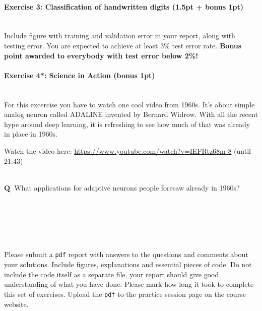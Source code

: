 \documentclass[a4paper,11pt]{article}
\newenvironment{exercise}[3]{\paragraph{Exercise #1: #2 (#3pt)}\ \\}{
\medskip}
\newcommand{\question}[2]{\setlength\parindent{0mm}\ \\$\mathbf{Q_#1:}$ #2\ \\}
\begin{document}
\begin{exercise}{3}{Classification of handwritten digits}{1.5pt + bonus 1}
Include figure with training and validation error in your report, along with testing error. You are expected to achieve at least 3\% test error rate. \textbf{Bonus point awarded to everybody with test error below 2\%!}

\end{exercise}



%
%
\begin{exercise}{4*}{Science in Action}{bonus 1}

For this excercise you have to watch one cool video from 1960s. It's about simple analog neuron called ADALINE invented by Bernard Widrow. With all the recent hype around deep learning, it is refreshing to see how much of that was already in place in 1960s.

Watch the video here: \url{https://www.youtube.com/watch?v=IEFRtz68m-8} (until 21:43)

\question{}{What applications for adaptive neurons people foresaw already in 1960s?}

\end{exercise}


\ \\
\ \\
\ \\
\ \\
\ \\
Please submit a \texttt{pdf} report with answers to the questions and comments about your solutions. Include figures, explanations and essential pieces of code. Do not include the code itself as a separate file, your report should give good understanding of what you have done. Please mark how long it took to complete this set of exercises. Upload the \texttt{pdf} to the practice session page on the course website.
\end{document}
